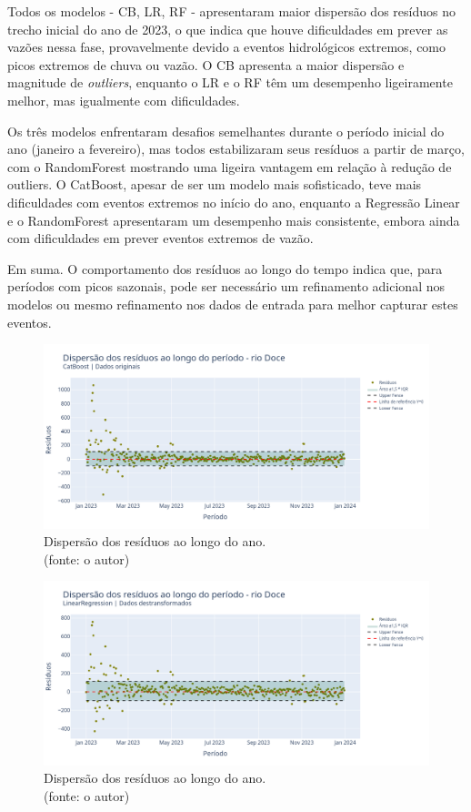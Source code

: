 Todos os modelos - CB, LR, RF - apresentaram maior dispersão dos resíduos no trecho inicial do ano de 2023, o que indica que houve dificuldades em prever as vazões nessa fase, provavelmente devido a eventos hidrológicos extremos, como picos extremos de chuva ou vazão. O CB apresenta a maior dispersão e magnitude de \textit{outliers}, enquanto o LR e o RF têm um desempenho ligeiramente melhor, mas igualmente com dificuldades.

Os três modelos enfrentaram desafios semelhantes durante o período inicial do ano (janeiro a fevereiro), mas todos estabilizaram seus resíduos a partir de março, com o RandomForest mostrando uma ligeira vantagem em relação à redução de outliers. O CatBoost, apesar de ser um modelo mais sofisticado, teve mais dificuldades com eventos extremos no início do ano, enquanto a Regressão Linear e o RandomForest apresentaram um desempenho mais consistente, embora ainda com dificuldades em prever eventos extremos de vazão.

Em suma. O comportamento dos resíduos ao longo do tempo indica que, para períodos com picos sazonais, pode ser necessário um refinamento adicional nos modelos ou mesmo refinamento nos dados de entrada para melhor capturar estes eventos.

\begin{figure}[!h]
\centering
\includegraphics[scale=0.33]{Figuras/rio_doce/wfv/CB/CB_WFV_ORIG_RESID_x_TEMPO.png}
\caption{Dispersão dos resíduos ao longo do ano.\\(fonte: o autor)}
\label{fig:doce_CB_WFV_ORIG_RESID_x_TEMPO}
\end{figure}

\begin{figure}[!h]
\centering
\includegraphics[scale=0.33]{Figuras/rio_doce/wfv/LR/LR_WFV_LOG_RESID_x_TEMPO.png}
\caption{Dispersão dos resíduos ao longo do ano.\\(fonte: o autor)}
\label{fig:doce_LR_WFV_LOG_RESID_x_TEMPO}
\end{figure}

